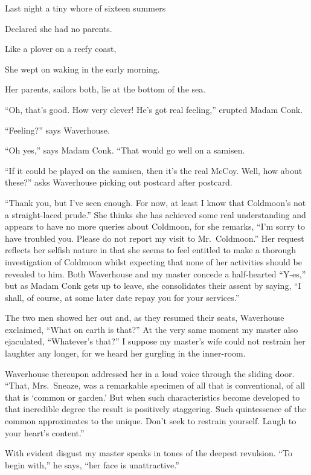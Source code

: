 \documentclass{book}
\begin{document}
Last night a tiny whore of sixteen summers

Declared she had no parents.

Like a plover on a reefy coast,

She wept on waking in the early morning.

Her parents, sailors both, lie at the bottom of the sea.

``Oh, that's good. How very clever! He's got real feeling,'' erupted
Madam Conk.

``Feeling?'' says Waverhouse.

``Oh yes,'' says Madam Conk. ``That would go well on a samisen.

``If it could be played on the samisen, then it's the real McCoy. Well,
how about these?'' asks Waverhouse picking out postcard after postcard.

``Thank you, but I've seen enough. For now, at least I know that
Coldmoon's not a straight-laced prude.'' She thinks she has achieved
some real understanding and appears to have no more queries about
Coldmoon, for she remarks, ``I'm sorry to have troubled you. Please do
not report my visit to Mr.~Coldmoon.'' Her request reflects her selfish
nature in that she seems to feel entitled to make a thorough
investigation of Coldmoon whilst expecting that none of her activities
should be revealed to him. Both Waverhouse and my master concede a
half-hearted ``Y-es,'' but as Madam Conk gets up to leave, she
consolidates their assent by saying, ``I shall, of course, at some later
date repay you for your services.''

The two men showed her out and, as they resumed their seats, Waverhouse
exclaimed, ``What on earth is that?'' At the very same moment my master
also ejaculated, ``Whatever's that?'' I suppose my master's wife could
not restrain her laughter any longer, for we heard her gurgling in the
inner-room.

Waverhouse thereupon addressed her in a loud voice through the sliding
door. ``That, Mrs.~Sneaze, was a remarkable specimen of all that is
conventional, of all that is `common or garden.' But when such
characteristics become developed to that incredible degree the result is
positively staggering. Such quintessence of the common approximates to
the unique. Don't seek to restrain yourself. Laugh to your heart's
content.''

With evident disgust my master speaks in tones of the deepest revulsion.
``To begin with,'' he says, ``her face is unattractive.''
\end{document}
